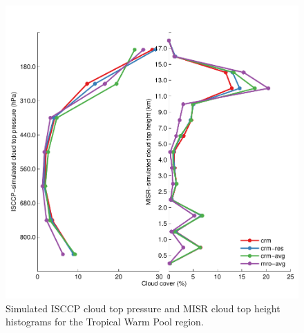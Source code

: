 \documentclass[letter]{article}
\begin{document}

\begin{figure}
\centering
\includegraphics{isccp-misr_cth.pdf}
\caption{Simulated ISCCP cloud top pressure and MISR cloud top height histograms for the Tropical Warm Pool region.}
\label{all_cth}
\end{figure}
\end{document}
